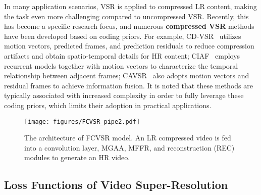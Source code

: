 In many application scenarios, VSR is applied to compressed LR content, making the task even more challenging compared to uncompressed VSR. Recently, this has become a specific research focus, and numerous \textbf{compressed VSR} methods~\cite{li2021comisr,chen2021compressed,zhang2022codec,wang2023compression,zhu2024deep,qiu2023learning,he2021fm, conde2024aim,chen2023gaussian} have been developed based on coding priors. For example, CD-VSR~\cite{chen2021compressed} utilizes motion vectors, predicted frames, and prediction residuals to reduce compression artifacts and obtain spatio-temporal details for HR content; CIAF~\cite{zhang2022codec} employs recurrent models together with motion vectors to characterize the temporal relationship between adjacent frames; CAVSR~\cite{wang2023compression} also adopts motion vectors and residual frames to achieve information fusion. It is noted that these methods are typically associated with increased complexity in order to fully leverage these coding priors, which limits their adoption in practical applications. 



\begin{figure*}[!t]
\centering
\texttt{[image: figures/FCVSR\_pipe2.pdf]}
\caption{ The architecture of FCVSR model. An LR compressed video is fed into a convolution layer, MGAA, MFFR, and reconstruction (REC) modules to generate an HR video.}
\label{fig_pipeline}
\end{figure*}

\subsection{Loss Functions of Video Super-Resolution}

